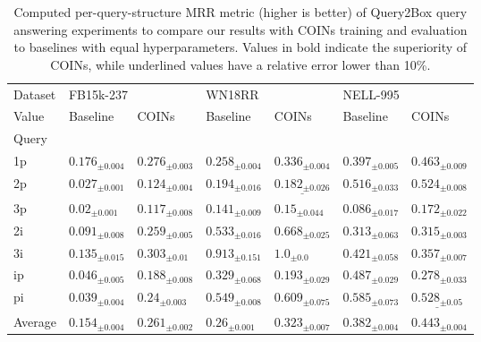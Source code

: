 \begin{table}[ht!]
  \caption[Computed MRR metric of Query2Box query answering experiments.]{Computed per-query-structure MRR metric (higher is better) of Query2Box query answering experiments to compare our results with COINs training and evaluation to baselines with equal hyperparameters. Values in bold indicate the superiority of COINs, while underlined values have a relative error lower than 10\%.}
  \label{tab:performance_query_answering_q2b}
  \centering
    \begin{adjustbox}{width=\textwidth}   
\begin{tabular}{lllllll}
\toprule
Dataset & \multicolumn{2}{l}{FB15k-237} & \multicolumn{2}{l}{WN18RR} & \multicolumn{2}{l}{NELL-995} \\
Value &                 Baseline &                           COINs &                 Baseline &                              COINs &                 Baseline &                             COINs \\
Query &                          &                                 &                          &                                    &                          &                                   \\
\midrule
1p    &  ${{0.176}_{\pm 0.004}}$ &  $\mathbf{{0.276}_{\pm 0.003}}$ &  ${{0.258}_{\pm 0.004}}$ &     $\mathbf{{0.336}_{\pm 0.004}}$ &  ${{0.397}_{\pm 0.005}}$ &    $\mathbf{{0.463}_{\pm 0.009}}$ \\
2p    &  ${{0.027}_{\pm 0.001}}$ &  $\mathbf{{0.124}_{\pm 0.004}}$ &  ${{0.194}_{\pm 0.016}}$ &  $\underline{{0.182}_{\pm 0.026}}$ &  ${{0.516}_{\pm 0.033}}$ &    $\mathbf{{0.524}_{\pm 0.008}}$ \\
3p    &   ${{0.02}_{\pm 0.001}}$ &  $\mathbf{{0.117}_{\pm 0.008}}$ &  ${{0.141}_{\pm 0.009}}$ &      $\mathbf{{0.15}_{\pm 0.044}}$ &  ${{0.086}_{\pm 0.017}}$ &    $\mathbf{{0.172}_{\pm 0.022}}$ \\
2i    &  ${{0.091}_{\pm 0.008}}$ &  $\mathbf{{0.259}_{\pm 0.005}}$ &  ${{0.533}_{\pm 0.016}}$ &     $\mathbf{{0.668}_{\pm 0.025}}$ &  ${{0.313}_{\pm 0.063}}$ &    $\mathbf{{0.315}_{\pm 0.003}}$ \\
3i    &  ${{0.135}_{\pm 0.015}}$ &   $\mathbf{{0.303}_{\pm 0.01}}$ &  ${{0.913}_{\pm 0.151}}$ &         $\mathbf{{1.0}_{\pm 0.0}}$ &  ${{0.421}_{\pm 0.058}}$ &           ${{0.357}_{\pm 0.007}}$ \\
ip    &  ${{0.046}_{\pm 0.005}}$ &  $\mathbf{{0.188}_{\pm 0.008}}$ &  ${{0.329}_{\pm 0.068}}$ &            ${{0.193}_{\pm 0.029}}$ &  ${{0.487}_{\pm 0.029}}$ &           ${{0.278}_{\pm 0.033}}$ \\
pi    &  ${{0.039}_{\pm 0.004}}$ &   $\mathbf{{0.24}_{\pm 0.003}}$ &  ${{0.549}_{\pm 0.008}}$ &     $\mathbf{{0.609}_{\pm 0.075}}$ &  ${{0.585}_{\pm 0.073}}$ &  $\underline{{0.528}_{\pm 0.05}}$ \\
\midrule
Average &  ${{0.154}_{\pm 0.004}}$ &     $\mathbf{{0.261}_{\pm 0.002}}$ &  ${{0.26}_{\pm 0.001}}$ &  $\mathbf{{0.323}_{\pm 0.007}}$ &  ${{0.382}_{\pm 0.004}}$ &  $\mathbf{{0.443}_{\pm 0.004}}$ \\
\bottomrule
\end{tabular}
\end{adjustbox}
\end{table}
